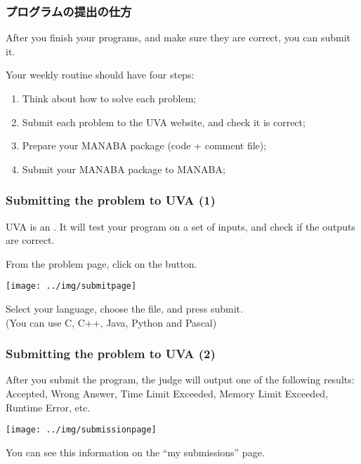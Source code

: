 \documentclass{beamer}
\begin{document}
\begin{frame}
  \frametitle{プログラムの提出の仕方} 
  
  After you finish your programs, \alert{and make sure they are
    correct}, you can submit it.

  \bigskip

  Your weekly routine should have four steps:
  \begin{enumerate}
    \item Think about how to solve each problem;
    \item Submit each problem to the UVA website, and check it is correct;
    \item Prepare your MANABA package (code + comment file);
    \item Submit your MANABA package to MANABA;
  \end{enumerate}
\end{frame}

\begin{frame}
  \frametitle{Submitting the problem to UVA (1)}

  {\small
  UVA is an . It will test your
  program on a set of inputs, and check if the outputs are correct.

  From the problem page, click on the  button. 
  
  \begin{center}
    \texttt{[image: ../img/submitpage]}
  \end{center}
  
  Select your language, choose the file, and press submit.\\
  (You can use C, C++, Java, Python {\tiny and Pascal})}
\end{frame}

\begin{frame}
  \frametitle{Submitting the problem to UVA (2)}

  {\small
    After you submit the program, the judge will output one of the
    following results: Accepted, Wrong Answer, Time Limit Exceeded,
    Memory Limit Exceeded, Runtime Error, etc.
    
    \begin{center}
      \texttt{[image: ../img/submissionpage]}
    \end{center}

    You can see this information on the ``my submissions'' page.
  }
\end{frame}
\end{document}
